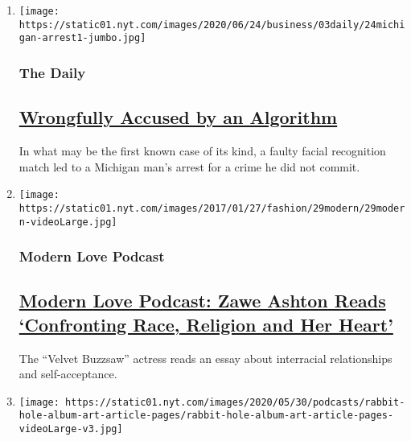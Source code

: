 \begin{enumerate}
\def\labelenumi{\arabic{enumi}.}
\item
  \texttt{[image: https://static01.nyt.com/images/2020/06/24/business/03daily/24michigan-arrest1-jumbo.jpg]}

  \hypertarget{the-daily}{%
  \subsubsection{The Daily}\label{the-daily}}

  \hypertarget{wrongfully-accused-by-an-algorithm}{%
  \subsection{\texorpdfstring{\href{/2020/08/03/podcasts/the-daily/algorithmic-justice-racism.html}{Wrongfully
  Accused by an
  Algorithm}}{Wrongfully Accused by an Algorithm}}\label{wrongfully-accused-by-an-algorithm}}

  In what may be the first known case of its kind, a faulty facial
  recognition match led to a Michigan man's arrest for a crime he did
  not commit.
\item
  \texttt{[image: https://static01.nyt.com/images/2017/01/27/fashion/29modern/29modern-videoLarge.jpg]}

  \hypertarget{modern-love-podcast}{%
  \subsubsection{Modern Love Podcast}\label{modern-love-podcast}}

  \hypertarget{modern-love-podcast-zawe-ashton-reads-confronting-race-religion-and-her-heart}{%
  \subsection{\texorpdfstring{\href{/2020/06/24/style/modern-love-podcast-zawe-ashton.html}{Modern
  Love Podcast: Zawe Ashton Reads `Confronting Race, Religion and Her
  Heart'}}{Modern Love Podcast: Zawe Ashton Reads `Confronting Race, Religion and Her Heart'}}\label{modern-love-podcast-zawe-ashton-reads-confronting-race-religion-and-her-heart}}

  The ``Velvet Buzzsaw'' actress reads an essay about interracial
  relationships and self-acceptance.
\item
  \texttt{[image: https://static01.nyt.com/images/2020/05/30/podcasts/rabbit-hole-album-art-article-pages/rabbit-hole-album-art-article-pages-videoLarge-v3.jpg]}


\end{enumerate}
